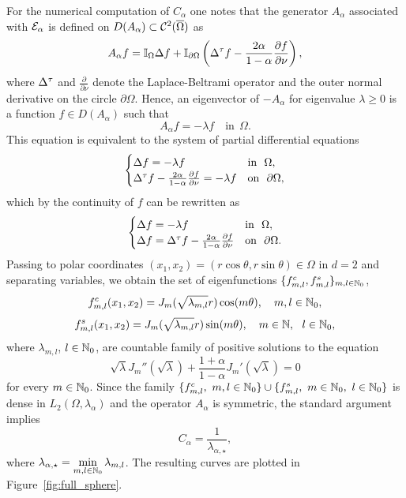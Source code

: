 \documentclass[a4paper]{article}
\theoremstyle{definition}
\numberwithin{equation}{section}
\begin{document}
For the numerical computation of  $C_\alpha$ one notes that  the generator $A_\alpha$ associated with $\mathcal{E}_\alpha$ is defined on $ D(A_\alpha) \subset \mathcal{C}^2(\overline{\Omega})$ as  
\[
  A_\alpha f =  \mathbb{I}_{\Omega}\Delta f+\mathbb{I}_{\partial \Omega}\left( \Delta^\tau f- \frac{ 2 \alpha }{ 1-\alpha }\frac{\partial f}{\partial \nu} \right),
\]
where $\Delta^\tau$  and $\frac{\partial}{\partial \nu}$ denote the Laplace-Beltrami operator  and the outer normal derivative on the circle $\partial \Omega$.
Hence, an eigenvector of $-A_\alpha$ for eigenvalue $\lambda \geq 0$ is a function $f\in D(A_\alpha)$ such that
\[
  A_\alpha f=-\lambda f \quad \mbox{in}\ \ \Omega.
\]
This equation is equivalent to the system of partial differential equations
\begin{equation*}
  \label{equ_equation_for_eigenvalues}
  \begin{cases}
    \Delta f= -\lambda f & \mbox{in}\ \ \Omega,\\
    \Delta^\tau f-\frac{2\alpha}{1-\alpha} \frac{\partial f}{\partial \nu}= -\lambda f & \mbox{on}\ \ \partial \Omega,
  \end{cases}
\end{equation*}
which by the continuity of $f$ can be rewritten  as
\begin{equation*}
  \label{equ_equation_for_eigenvalues_with_boundary_conditions}
  \begin{cases}
    \Delta f= -\lambda f & \mbox{in}\ \ \Omega,\\
    \Delta f=\Delta^\tau f-\frac{2\alpha}{1-\alpha} \frac{\partial f}{\partial \nu} & \mbox{on}\ \ \partial \Omega.
  \end{cases}
\end{equation*}
Passing to polar coordinates  $(x_1,x_2)=(r\cos\theta,r\sin\theta)\in\Omega$ in $d=2$ and separating variables, we obtain the set of eigenfunctions $\{f_{m,l}^c,f_{m,l}^s\}_{m,l \in \mathbb{N}_0}$,
\[
f_{m,l}^c(x_1,x_2)=J_m(\sqrt{\lambda_{m,l}}r)\cos(m\theta), \quad m,l \in\mathbb{N}_0,
\]
\[
f_{m,l}^s(x_1,x_2)=J_m(\sqrt{\lambda_{m,l}}r)\sin(m\theta), \quad m \in\mathbb{N},\ \ l \in\mathbb{N}_0,
\]
where  $\lambda_{m,l}$, $l \in\mathbb{N}_0$, are countable family of positive solutions to the  equation
\begin{equation} %
  \label{equ_equation_for_gamma}
  \sqrt{\lambda} J_m''(\sqrt{ \lambda })+\frac{ 1+ \alpha }{ 1-\alpha }J_m'(\sqrt{ \lambda })=0
\end{equation}
for every $m \in \mathbb{N}_0$. Since the family $\{f_{m,l}^c,\ m,l \in\mathbb{N}_0\}\cup\{f_{m,l}^s,\ m\in\mathbb{N}_0,\ l\in\mathbb{N}_0\}$ is dense in $L_2(\Omega,\lambda_\alpha)$  and the operator $A_\alpha$ is symmetric, the standard argument implies 
\begin{equation}
\label{optimal_constant}
C_\alpha=\frac{1}{\lambda_{\alpha,\star}},
\end{equation}
where $\lambda_{\alpha,\star}=\min\limits_{m,l\in\mathbb{N}_0}\lambda_{m,l}$. The resulting curves  are plotted in Figure~\ref{fig:full_sphere}.
\end{document}
